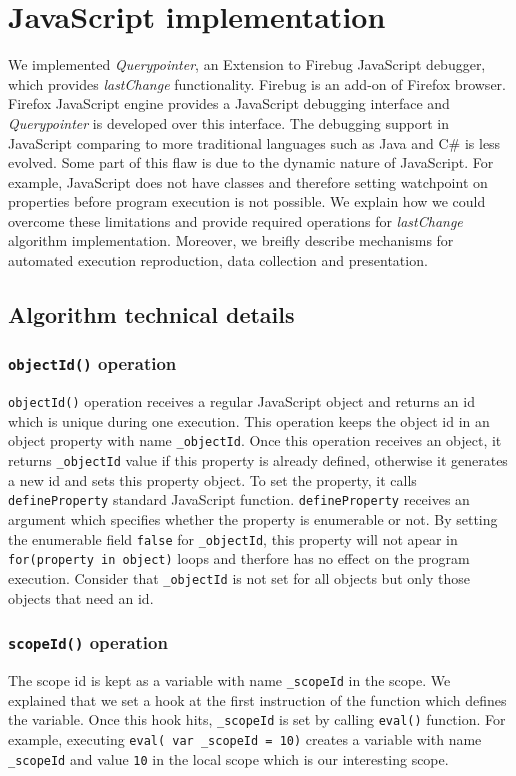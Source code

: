 \documentclass[preprint]{sigplanconf}
\begin{document}
\section{JavaScript implementation}
We implemented \textit{Querypointer}, an Extension to Firebug JavaScript debugger, which provides \textit{lastChange} functionality. Firebug is an add-on of Firefox browser. Firefox JavaScript engine provides a JavaScript debugging interface and \textit{Querypointer} is developed over this interface. The debugging support in JavaScript comparing to more traditional languages such as Java and C\# is less evolved. Some part of this flaw is due to the dynamic nature of JavaScript. For example, JavaScript does not have classes and therefore setting watchpoint on properties before program execution is not possible. We explain how we could overcome these limitations and provide required operations for \textit{lastChange} algorithm implementation. Moreover, we breifly describe mechanisms for automated execution reproduction, data collection and presentation.

\subsection{Algorithm technical details}
\subsubsection{\texttt{objectId()} operation}
\texttt{objectId()} operation receives a regular JavaScript object and returns an id which is unique during one execution. This operation keeps the object id in an object property with name \texttt{\_objectId}. Once this operation receives an object, it returns \texttt{\_objectId} value if this property is already defined, otherwise it generates a new id and sets this property object. To set the property, it calls \texttt{defineProperty} standard JavaScript function. \texttt{defineProperty} receives an argument which specifies whether the property is enumerable or not. By setting the enumerable field \texttt{false} for \texttt{\_objectId}, this property will not apear in \texttt{for(property in object)} loops and therfore has no effect on the program execution. Consider that \texttt{\_objectId} is not set for all objects but only those objects that need an id.

\subsubsection{\texttt{scopeId()} operation}
The scope id is kept as a variable with name \texttt{\_scopeId} in the scope. We explained that we set a hook at the first instruction of the function which defines the variable. Once this hook hits, \texttt{\_scopeId} is set by calling \texttt{eval()} function. For example, executing \texttt{eval( var \_scopeId = 10)} creates a variable with name \texttt{\_scopeId} and value \texttt{10} in the local scope which is our interesting scope.
\end{document}

